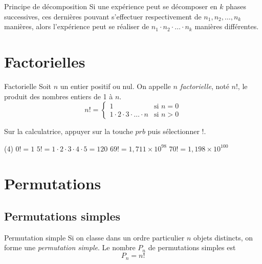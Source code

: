 \documentclass[a4paper,12pt]{article}
\begin{document}
\begin{thm}
	Principe de décomposition
	\tcblower
	Si une expérience peut se décomposer en $k$ phases successives, ces dernières pouvant s'effectuer respectivement de $n_1, n_2, \ldots, n_k$ manières, alors l'expérience peut se réaliser de $n_1 \cdot n_2 \cdot \ldots \cdot n_k$ manières différentes.
\end{thm}

\section{Factorielles}

\begin{definition}
	Factorielle
	\tcblower
	Soit $n$ un entier positif ou nul. On appelle \emph{$n$ factorielle}, noté $n!$, le produit des nombres entiers de 1 à $n$.
	\[n! = \begin{cases}
	1 & \text{si } n = 0 \\
	1 \cdot 2 \cdot 3 \cdot \ldots \cdot n & \text{si } n > 0
	\end{cases}\]
\end{definition}

\begin{remarque}
	\tcblower
	Sur la calculatrice, appuyer sur la touche $prb$ puis sélectionner $!$.
\end{remarque}

\begin{exemple}
	\tcblower
	\begin{tasks}(4)
		\task $0! = 1$
		\task $5! = 1 \cdot 2 \cdot 3 \cdot 4 \cdot 5 = 120$
		\task $69! = 1{,}711 \times 10^{98}$
		\task $70! = 1{,}198 \times 10^{100}$
	\end{tasks}
\end{exemple}

\section{Permutations}

\subsection{Permutations simples}

\begin{definition}
	Permutation simple
	\tcblower
	Si on classe dans un ordre particulier $n$ objets distincts, on forme une \emph{permutation simple}. Le nombre $P_n$ de permutations simples est
	\[P_n = n!\]
\end{definition}
\end{document}
